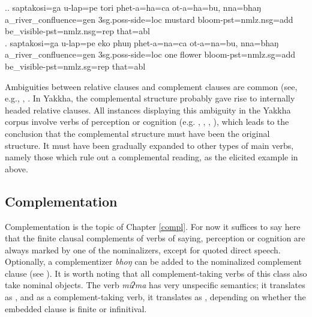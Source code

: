 \ex.\ag. saptakosi=ga u-lap=pe tori phet-a=ha=ca ot-a=ha=bu, nna=bhaŋ\\
		a\_river\_confluence{\sc =gen} {\sc 3sg.poss}-side{\sc =loc} mustard bloom{\sc [3sg]-pst=nmlz.nsg=add}  be\_visible{\sc [3sg]-pst=nmlz.nsg=rep} that{\sc =abl}	\\
	  
 \bg.	saptakosi=ga u-lap=pe eko phuŋ phet-a=na=ca ot-a=na=bu, nna=bhaŋ\\
		a\_river\_confluence{\sc =gen} {\sc 3sg.poss}-side{\sc =loc} one flower bloom{\sc [3sg]-pst=nmlz.sg=add}  be\_visible{\sc [3sg]-pst=nmlz.sg=rep} that{\sc =abl}	\\

Ambiguities between relative clauses and complement clauses are common (see, e.g., \citet[272]{Bickel1999Nominalization}, \citet[120, 143]{Noonan2007Complementation}. In Yakkha, the complemental structure probably gave rise to internally headed relative clauses. All instances  displaying this ambiguity in the Yakkha corpus involve verbs of perception or cognition (e.g. , , , ), which leads to the conclusion that the complemental structure must have been the original structure. It must have been gradually expanded  to other types of main verbs, namely those which rule out a complemental reading, as the elicited example in \LLast above.




\subsection{Complementation}\label{nmlz-uni-2}

Complementation is the topic of Chapter \ref{compl}. For now it suffices to say here that the finite clausal complements of verbs of saying, perception or cognition are always marked by one of the nominalizers, except for quoted direct speech. Optionally, a complementizer \emph{bhoŋ}  can be added to the nominalized complement clause (see \Next[b]). It is worth noting that all complement-taking verbs of this class also take nominal objects. The verb \emph{miʔma} has very unspecific semantics; it translates as , and as a complement-taking verb, it translates as , depending on whether the embedded clause is finite or infinitival. 

